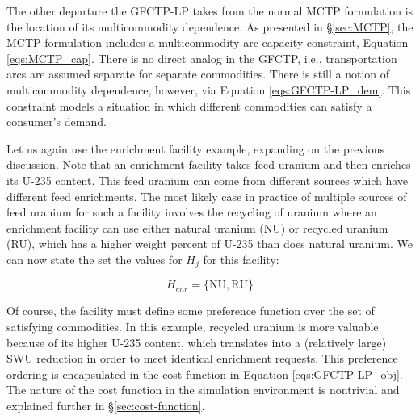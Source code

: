 The other departure the GFCTP-LP takes from the normal MCTP formulation is the
location of its multicommodity dependence. As presented in \S\ref{sec:MCTP}, the
MCTP formulation includes a multicommodity arc capacity constraint, Equation
\ref{eqs:MCTP_cap}. There is no direct analog in the GFCTP, i.e., transportation
arcs are assumed separate for separate commodities. There is still a notion of
multicommodity dependence, however, via Equation \ref{eqs:GFCTP-LP_dem}. This
constraint models a situation in which different commodities can satisfy a
consumer's demand.

Let us again use the enrichment facility example, expanding on the previous
discussion. Note that an enrichment facility takes feed uranium and then
enriches its U-235 content. This feed uranium can come from different sources
which have different feed enrichments. The most likely case in practice of
multiple sources of feed uranium for such a facility involves the recycling of
uranium where an enrichment facility can use either natural uranium (NU) or
recycled uranium (RU), which has a higher weight percent of U-235 than does
natural uranium. We can now state the set the values for $H_{j}$ for this
facility:

\begin{equation}\label{eqs:enr-dem-commods}
  H_{enr} = \{ \mbox{NU}, \mbox{RU} \}
\end{equation}

Of course, the facility must define some preference function over the set of
satisfying commodities. In this example, recycled uranium is more valuable
because of its higher U-235 content, which translates into a (relatively large)
SWU reduction in order to meet identical enrichment requests. This preference
ordering is encapsulated in the cost function in Equation
\ref{eqs:GFCTP-LP_obj}. The nature of the cost function in the \Cyclus
simulation environment is nontrivial and explained further in
\S\ref{sec:cost-function}.
